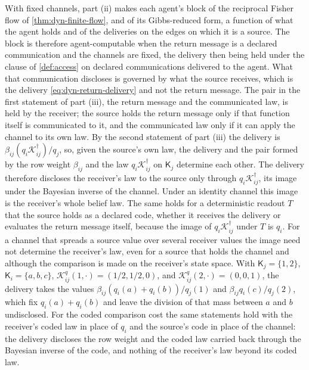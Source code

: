With fixed channels, part (ii) makes each agent's block of the reciprocal Fisher flow of \cref{thm:dyn-finite-flow}, and of its Gibbs-reduced form, a function of what the agent holds and of the deliveries on the edges on which it is a source. The block is therefore agent-computable when the return message is a declared communication and the channels are fixed, the delivery then being held under the clause of \cref{def:access} on declared communications delivered to the agent. What that communication discloses is governed by what the source receives, which is the delivery \cref{eq:dyn-return-delivery} and not the return message. The pair in the first statement of part (iii), the return message and the communicated law, is held by the receiver; the source holds the return message only if that function itself is communicated to it, and the communicated law only if it can apply the channel to its own law. By the second statement of part (iii) the delivery is $\beta_{ij}(q_i\mathcal K^\dagger_{ij})/q_j$, so, given the source's own law, the delivery and the pair formed by the row weight $\beta_{ij}$ and the law $q_i\mathcal K^\dagger_{ij}$ on $\mathsf K_j$ determine each other. The delivery therefore discloses the receiver's law to the source only through $q_i\mathcal K^\dagger_{ij}$, its image under the Bayesian inverse of the channel. Under an identity channel this image is the receiver's whole belief law. The same holds for a deterministic readout $T$ that the source holds as a declared code, whether it receives the delivery or evaluates the return message itself, because the image of $q_i\mathcal K^\dagger_{ij}$ under $T$ is $q_i$. For a channel that spreads a source value over several receiver values the image need not determine the receiver's law, even for a source that holds the channel and although the comparison is made on the receiver's state space. With $\mathsf K_j=\{1,2\}$, $\mathsf K_i=\{a,b,c\}$, $\mathcal K^q_{ij}(1,\cdot)=(1/2,1/2,0)$, and $\mathcal K^q_{ij}(2,\cdot)=(0,0,1)$, the delivery takes the values $\beta_{ij}(q_i(a)+q_i(b))/q_j(1)$ and $\beta_{ij}q_i(c)/q_j(2)$, which fix $q_i(a)+q_i(b)$ and leave the division of that mass between $a$ and $b$ undisclosed. For the coded comparison cost the same statements hold with the receiver's coded law in place of $q_i$ and the source's code in place of the channel: the delivery discloses the row weight and the coded law carried back through the Bayesian inverse of the code, and nothing of the receiver's law beyond its coded law.

